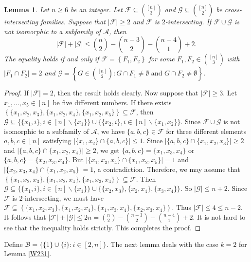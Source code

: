 \documentclass[11pt]{article}
\numberwithin{equation}{section}
\newtheorem{lemma}[theorem]{Lemma}
\begin{document}
\begin{lemma}\label{HK31}
 Let $n \geq 6$ be an integer.  Let $\mathcal{F} \subseteq\binom{[n]}{3}$ and $\mathcal{G} \subseteq\binom{[n]}{2}$ be cross-intersecting families. Suppose that $|\mathcal{F}| \geq 2$ and $\mathcal{F}$ is $2$-intersecting.  If $\mathcal{F}\cup \mathcal{G}$ is not isomorphic to a subfamily of $\mathcal{A}$, then
$$
|\mathcal{F}|+|\mathcal{G}| \leq\binom{n}{2}-\binom{n-3}{2}-\binom{n-4}{1}+2.
$$
The equality holds if and only if $\mathcal{F}=\left\{F_1, F_2\right\}$ for some $F_1, F_2 \in\binom{[n]}{3}$ with $\left|F_1 \cap F_2\right|=2$ and $\mathcal{G}=\left\{G \in\binom{[n]}{2}: G \cap F_1 \neq \emptyset \text{ and } G \cap F_2 \neq \emptyset\right\}$.
\end{lemma}
\begin{proof}
If $|\mathcal{F}|=2$, then the result holds clearly.
Now suppose that  $|\mathcal{F}|\geq 3$. Let $x_1, \ldots, x_5\in [n]$ be five different numbers. If there exists $\left\{\{x_1, x_2, x_3\}, \{x_1, x_2, x_4\}, \{x_1, x_2, x_5\}\right\}\subseteq \mathcal{F}$, then
$
\mathcal{G}\subseteq \{\{x_1,i\}, i\in [n]\backslash \{x_1\} \}\cup \{\{x_2,i\}, i\in [n]\backslash \{x_1,x_2\} \}.$
Since $\mathcal{F}\cup \mathcal{G}$ is not isomorphic to a subfamily of $\mathcal{A}$, we have $\{a, b,c\}\in \mathcal{F}$ for three different elements $a, b, c\in [n]$ satisfying $|\{x_1, x_2\}\cap \{a, b,c\}|\leq 1$.  Since $|\{a, b,c\}\cap\{x_1, x_2, x_3\}|\geq 2$ and $|\{a, b,c\}\cap\{x_1, x_2, x_4\}|\geq 2$, we get $\{a, b,c\}=\{x_1, x_3, x_4\}$ or $\{a, b,c\}=\{x_2, x_3, x_4\}$. But  $|\{x_1, x_3, x_4\}\cap\{x_1, x_2, x_5\}|=1$ and
$|\{x_2, x_3, x_4\}\cap\{x_1, x_2, x_5\}|=1$, a contradiction.
Therefore, we may assume that $\left\{\{x_1, x_2, x_3\}, \{x_1, x_2, x_4\}, \{x_1, x_3, x_4\}\right\}\subseteq \mathcal{F}$. Then
$
\mathcal{G}\subseteq \{\{x_1,i\}, i\in [n]\backslash \{x_1\} \}\cup \{\{x_2,x_3\}, \{x_2,x_4\}, \{x_3,x_4\}\}.
$
So $|\mathcal{G}|\leq n+2$. Since $\mathcal{F}$ is $2$-intersecting, we must have $\mathcal{F}\subseteq\left\{\{x_1, x_2, x_3\}, \{x_1, x_2, x_4\}, \{x_1, x_3, x_4\}, \{x_2, x_3, x_4\}\right\}$. Thus $|\mathcal{F}| \leq 4\leq n-2$.
It follows that
$|\mathcal{F}|+|\mathcal{G}| \leq 2n=\binom{n}{2}-\binom{n-3}{2}-\binom{n-4}{1}+2$. It is not hard to see that the inequality holds strictly. This completes the proof.
\end{proof}

Define  $\mathcal{B}=\{\{1\} \cup\{i\}: i \in[2, n]\}$.
The next lemma deals with the case $k=2$ for Lemma \ref{W231}.
\end{document}
